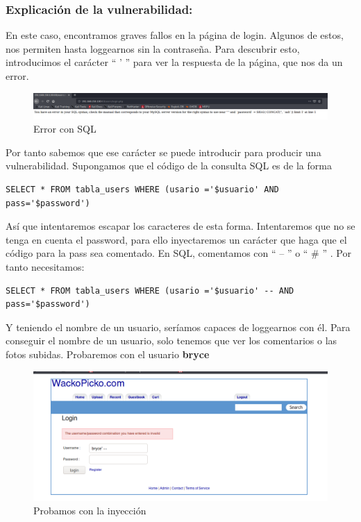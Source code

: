 \documentclass[12pt,twoside]{article}
\begin{document}
\subsubsection*{Explicación de la vulnerabilidad:}
En este caso, encontramos graves fallos en la página de login. Algunos de estos, nos permiten hasta loggearnos sin la contraseña.
Para descubrir esto, introducimos el carácter `` ' '' para ver la respuesta de la página, que nos da un error.
\begin{figure}[H]
    \centering
    \includegraphics[scale=0.45]{./imagenes/inyeccion_sql1}
    \caption{Error con SQL}
\end{figure}
Por tanto sabemos que ese carácter se puede introducir para producir una vulnerabilidad. 
Supongamos que el código de la consulta SQL es de la forma
\begin{verbatim}
SELECT * FROM tabla_users WHERE (usario ='$usuario' AND pass='$password')
\end{verbatim}
Así que intentaremos escapar los caracteres de esta forma. Intentaremos que no se tenga en cuenta el password, para ello inyectaremos un carácter que haga que el código para la pass sea comentado. En SQL, comentamos con `` -- '' o `` \# '' . Por tanto necesitamos:
\begin{verbatim}
SELECT * FROM tabla_users WHERE (usario ='$usuario' -- AND pass='$password')
\end{verbatim}
Y teniendo el nombre de un usuario, seríamos capaces de loggearnos con él. Para conseguir el nombre de un usuario, solo tenemos que ver los comentarios o las fotos subidas. Probaremos con el usuario \textbf{bryce}
\begin{figure}[H]
    \centering
    \includegraphics[scale=0.45]{./imagenes/inyeccion_sql_bryce}
    \caption{Probamos con la inyección}
\end{figure}
\end{document}
